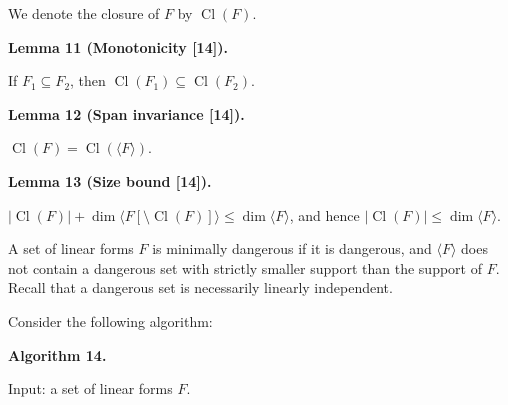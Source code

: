 \documentclass[10pt,a4paper]{article}
\begin{document}
We denote the closure of $F$ by $\mathop{\mathrm{Cl}}(F)$.\par



\par\medskip\noindent\textbf{
Lemma 11 (Monotonicity [14]).
}\par



If $F_{1}\subseteq F_{2}$, then $\mathop{\mathrm{Cl}}(F_{1})\subseteq\mathop{\mathrm{Cl}}(F_{2})$.\par




\par\medskip\noindent\textbf{
Lemma 12 (Span invariance [14]).
}\par



$\mathop{\mathrm{Cl}}(F)=\mathop{\mathrm{Cl}}(\langle F\rangle)$.\par




\par\medskip\noindent\textbf{
Lemma 13 (Size bound [14]).
}\par



$|\mathop{\mathrm{Cl}}(F)|+\dim\langle F[\setminus\mathop{\mathrm{Cl}}(F)]\rangle\leq\dim\langle F\rangle$, and hence
$|\mathop{\mathrm{Cl}}(F)|\leq\dim\langle F\rangle$.\par




A set of linear forms $F$ is minimally dangerous if it is dangerous, and $\langle F\rangle$ does not contain a dangerous set with strictly smaller support than the support of $F$. Recall that a dangerous set is necessarily linearly independent.\par



Consider the following algorithm:\par



\par\medskip\noindent\textbf{
Algorithm 14.
}\par



Input: a set of linear forms $F$.\par
\end{document}
